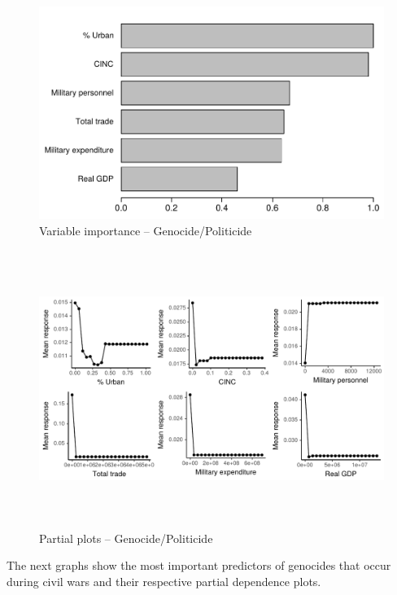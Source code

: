 \begin{figure}[H]
    \centering
    \includegraphics{images/drf-gp.pdf}
    \caption{Variable importance -- Genocide/Politicide}
    \label{fig:my_label}
\end{figure}

\begin{figure}[H]
    \centering
    \includegraphics[width=\textwidth, height=9cm]{images/drfdpp4a.pdf}
    \caption{Partial plots -- Genocide/Politicide}
    \label{fig:my_label}
\end{figure}

\newpage

The next graphs show the most important predictors of genocides that occur during civil wars and their respective partial dependence plots. 

